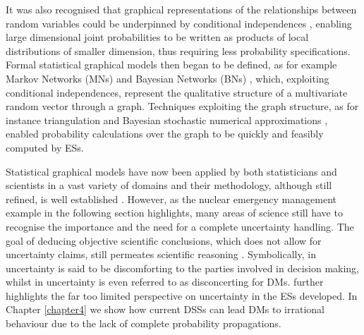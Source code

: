 It was also recognised that graphical representations of the relationships between random variables could be underpinned by conditional independences \citep[][]{Dawid1979}, enabling large dimensional joint probabilities to be written as  products of local distributions of smaller dimension, thus requiring less probability specifications. Formal statistical graphical models then began to be defined, as for example Markov Networks (MNs) and Bayesian Networks (BNs) \citep[see e.g.][and Sections \ref{sec:BN} and \ref{sec:UG}]{Lauritzen1996a,Pearl1988a}, which, exploiting conditional independences, represent the qualitative structure of a multivariate random vector through a graph. Techniques exploiting the graph structure, as for instance triangulation \citep[see e.g.][]{Spiegelhalter1993} and Bayesian stochastic numerical approximations \citep[see e.g.][]{Gilks1996}, enabled probability calculations over the graph to be quickly and feasibly computed by ESs. 

Statistical graphical models have now been applied by both statisticians and scientists in a vast variety of domains and their methodology, although still refined, is well established \citep{Aguilera2011,Jordan2004,Korb2003,Oliver1990,Smith2010,Uusitalo2007}. However, as the nuclear emergency management example in the following section highlights, many areas of science still have to recognise the importance and the need for a complete uncertainty handling. The goal of deducing objective scientific conclusions, which does not allow for uncertainty claims, still permeates scientific reasoning \citep[see for example the recent discussion in][concerning the continuous development of higher-resolution simulators for predicting climate change] {Rougier2015}. Symbolically, in \citet{Carter2006} uncertainty is said to be discomforting to the parties involved in decision making, whilst in \citet{Ahlbrecht1997} uncertainty is even referred to as disconcerting for DMs. \citet{Carter2006} further highlights the far too limited perspective on uncertainty in the ESs developed. In Chapter \ref{chapter4} we show how current DSSs can lead DMs to irrational behaviour due to the lack of complete probability propagations. 
     

